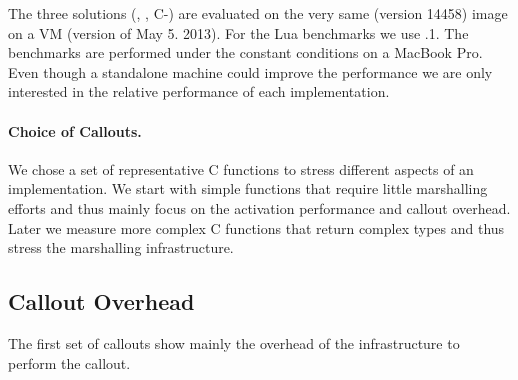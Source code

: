 The three \ST \FFI solutions (\NB, \Alien, C-\FFI) are evaluated on the very same  (version 14458) image on a \PH VM (version of May 5. 2013).
For the Lua benchmarks we use .1.
The benchmarks are performed under the constant conditions on a MacBook Pro.
Even though a standalone machine could improve the performance we are only interested in the relative performance of each implementation.


\paragraph{Choice of Callouts.}
We chose a set of representative C functions to stress different aspects of an \FFI implementation.
We start with simple functions that require little marshalling efforts and thus mainly focus on the activation performance and callout overhead.
Later we measure more complex C functions that return complex types and thus stress the marshalling infrastructure.

\subsection{Callout Overhead}

The first set of \FFI callouts show mainly the overhead of the \FFI infrastructure to perform the callout.

